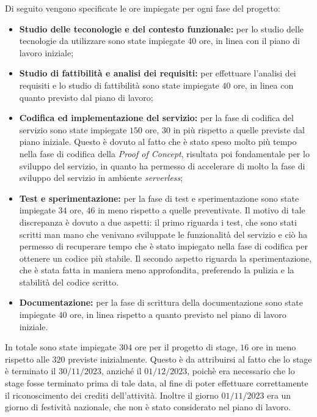Di seguito vengono specificate le ore impiegate per ogni fase del progetto:
\begin{itemize}
    \item \textbf{Studio delle teconologie e del contesto funzionale:} per lo
          studio delle tecnologie da utilizzare sono state impiegate $40$ ore, in
          linea con il piano di lavoro iniziale;
    \item \textbf{Studio di fattibilità e analisi dei requisiti:} per effettuare
          l'analisi dei requisiti e lo studio di fattibilità sono state impiegate
          $40$ ore, in linea con quanto previsto dal piano di lavoro;
    \item \textbf{Codifica ed implementazione del servizio:} per la fase di
          codifica del servizio sono state impiegate $150$ ore, $30$ in più rispetto a
          quelle previste dal piano iniziale. Questo è dovuto al fatto che è stato
          speso molto più tempo nella fase di codifica della \emph{Proof of Concept},
          risultata poi fondamentale per lo sviluppo del servizio, in quanto ha
          permesso di accelerare di molto la fase di sviluppo del servizio in ambiente
          \emph{serverless};
    \item \textbf{Test e sperimentazione:} per la fase di test e sperimentazione
          sono state impiegate $34$ ore, $46$ in meno rispetto a quelle
          preventivate. Il motivo di tale discrepanza è dovuto a due aspetti: il primo
          riguarda i test, che sono stati scritti man mano che venivano sviluppate le
          funzionalità del servizio e ciò ha permesso di recuperare tempo che è stato
          impiegato nella fase di codifica per ottenere un codice più stabile. Il
          secondo aspetto riguarda la sperimentazione, che è stata fatta in maniera
          meno approfondita, preferendo la pulizia e la stabilità del codice scritto.
    \item \textbf{Documentazione:} per la fase di scrittura della documentazione
          sono state impiegate $40$ ore, in linea rispetto a quanto previsto nel piano
          di lavoro iniziale.
\end{itemize}

In totale sono state impiegate $304$ ore per il progetto di stage, $16$ ore in
meno rispetto alle $320$ previste inizialmente. Questo è da attribuirsi al fatto
che lo stage è terminato il $30/11/2023$, anziché il $01/12/2023$, poichè era
necessario che lo stage fosse terminato prima di tale data, al fine di poter
effettuare correttamente il
riconoscimento dei crediti dell'attività. Inoltre il giorno $01/11/2023$ era un
giorno di festività nazionale, che non è stato considerato nel piano di lavoro.